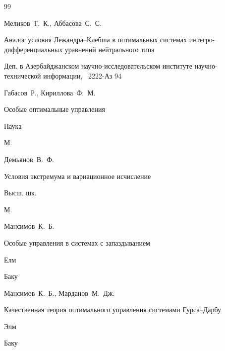 \begin{thebibliography}{99}





\by Меликов~Т.~К., Аббасова~С.~С.


\preprint Аналог условия Лежандра--Клебша в оптимальных системах интегро-дифференциальных уравнений нейтрального типа

\preprintinfo Деп. в  Азербайджанском научно-исследовательском институте научно-технической информации, \No~2222-Аз 94






\by Габасов~Р., Кириллова~Ф.~М.

\book Особые оптимальные управления


\publ Наука

\publaddr М.






\by Демьянов~В.~Ф.

\book Условия экстремума и вариационное исчисление


\publ Высш. шк.

\publaddr М.





\by Мансимов~К.~Б. 

\book Особые управления в системах с запаздыванием


\publ Елм

\publaddr Баку





\by Мансимов~К.~Б., Марданов~М.~Дж.

\book Качественная теория оптимального управления системами Гурса--Дарбу


\publ Элм

\publaddr Баку


\end{thebibliography}
